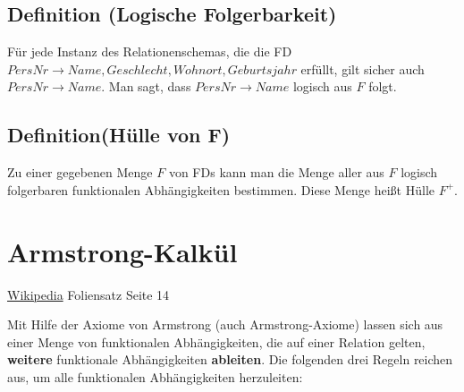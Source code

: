 \documentclass{lehramt-informatik-haupt}
\begin{document}
%

\subsection{Definition (Logische Folgerbarkeit)}

Für jede Instanz des Relationenschemas, die die FD $PersNr \rightarrow
Name, Geschlecht, Wohnort, Geburtsjahr$ erfüllt, gilt sicher auch
$PersNr \rightarrow Name$. Man sagt, dass $PersNr \rightarrow Name$
logisch aus $F$ folgt.

%

\subsection{Definition(Hülle von F)}

Zu einer gegebenen Menge $F$ von FDs kann man die Menge aller aus $F$
logisch folgerbaren funktionalen Abhängigkeiten bestimmen. Diese Menge
heißt Hülle $F^+$.

%

\section{Armstrong-Kalkül}

\href{https://de.wikipedia.org/wiki/Funktionale_Abh%C3%A4ngigkeit#Axiome_von_Armstrong}{Wikipedia}
Foliensatz Seite 14

Mit Hilfe der Axiome von Armstrong (auch Armstrong-Axiome) lassen sich
aus einer Menge von funktionalen Abhängigkeiten, die auf einer Relation
gelten, \textbf{weitere} funktionale Abhängigkeiten \textbf{ableiten}.
Die folgenden drei Regeln reichen aus, um alle funktionalen
Abhängigkeiten herzuleiten:
\end{document}
